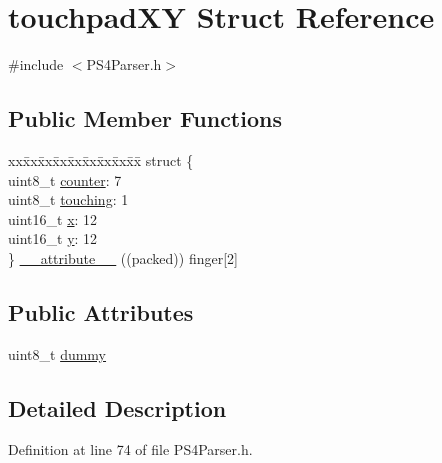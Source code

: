 \hypertarget{structtouchpad_x_y}{\section{touchpad\-X\-Y \-Struct \-Reference}
\label{structtouchpad_x_y}
}


{\ttfamily \#include $<$\-P\-S4\-Parser.\-h$>$}

\subsection*{\-Public \-Member \-Functions}
\begin{DoxyCompactItemize}
\item 
\begin{tabbing}
xx\=xx\=xx\=xx\=xx\=xx\=xx\=xx\=xx\=\kill
struct \{\\
\>uint8\_t \hyperlink{structtouchpad_x_y_ae52c34f2e6e66933e06b2f3448badcf0}{counter}: 7\\
\>uint8\_t \hyperlink{structtouchpad_x_y_a2c078e99c3b96303e6b6a60e2f36acc5}{touching}: 1\\
\>uint16\_t \hyperlink{structtouchpad_x_y_a1c38a3e4161b1495b4d8ce37124c72a5}{x}: 12\\
\>uint16\_t \hyperlink{structtouchpad_x_y_ac4ceb26c0ebba1c5a2691a1ecdb7dbae}{y}: 12\\
\} \hyperlink{structtouchpad_x_y_ada45e99113ec27ea1f0e0c3deb04e0ea}{\_\_attribute\_\_} ((packed)) finger\mbox{[}2\mbox{]}\\

\end{tabbing}\end{DoxyCompactItemize}
\subsection*{\-Public \-Attributes}
\begin{DoxyCompactItemize}
\item 
uint8\-\_\-t \hyperlink{structtouchpad_x_y_aad3a6094ac41933907969856dfb93e15}{dummy}
\end{DoxyCompactItemize}


\subsection{\-Detailed \-Description}


\-Definition at line 74 of file \-P\-S4\-Parser.\-h.



